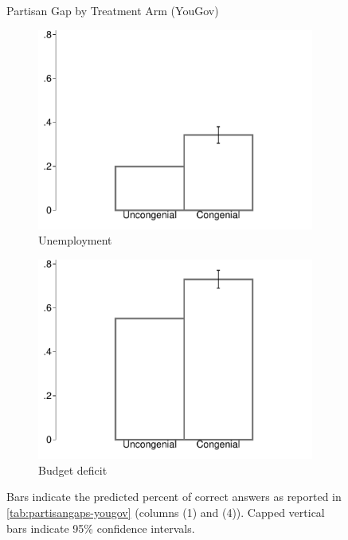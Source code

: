 \documentclass[12pt, letterpaper]{article}
\begin{document}
\begin{figure}[t]
    \caption{Partisan Gap by Treatment Arm (YouGov)}    
    \centering
    \begin{subfigure}{.495\textwidth}\centering
        \includegraphics[width=\textwidth]{../figs/yougov-unemp-congenialcue.pdf}
        \caption{Unemployment}
    \end{subfigure}
    \hfil
    \begin{subfigure}{.495\textwidth}\centering
        \includegraphics[width=\textwidth]{../figs/yougov-deficit-congenialcue.pdf}
        \caption{Budget deficit}
    \end{subfigure} 
    \caption*{\footnotesize Bars indicate the predicted percent of correct answers as reported in \cref{tab:partisangaps-yougov} (columns (1) and (4)).  
        Capped vertical bars indicate 95\% confidence intervals.
    }
    \label{fig:yougov-reg}
\end{figure}
\end{document}
